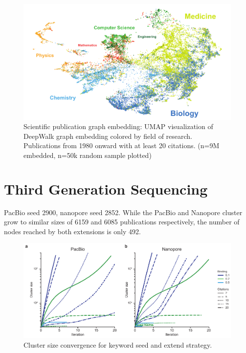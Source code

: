 \begin{figure}[h]
	\centering
	\includegraphics[width=1.0\textwidth]{figures/state_of_art/umap_global.pdf}
	\captionsetup{format=plain}
	\caption[Scientific literature graph]{Scientific publication graph embedding: UMAP visualization of DeepWalk graph embedding colored by field of research. Publications from 1980 onward with at least 20 citations. (n=9M embedded, n=50k random sample plotted)}
	\label{fig:state_of_art:umap_global}
\end{figure}




\section{Third Generation Sequencing}
\label{sec:state_of_art:third_generation}

PacBio seed 2900, nanopore seed 2852.
While the PacBio and Nanopore cluster grow to similar sizes of 6159 and 6085 publications respectively, the number of nodes reached by both extensions is only 492.


\begin{figure}[h]
	\centering
	\includegraphics[width=1.0\textwidth]{figures/state_of_art/cluster_convergence.pdf}
	\captionsetup{format=plain}
	\caption[Keyword Seed and Extend Convergence]{Cluster size convergence for keyword seed and extend strategy.}
	\label{fig:state_of_art:cluster_convergence}
\end{figure}

